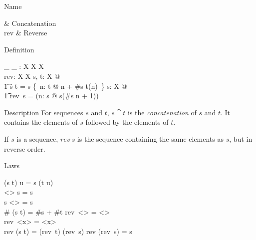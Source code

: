 \begin{manpage}\label{p:4020}
\item[Name]
\begin{name}
        \cat & Concatenation\symdex{$\cat$} \\
        rev & Reverse
\end{name}

\item[Definition]
\begin{gendef}[X]
        \_ \cat \_ :  \seq X \cross \seq X \fun \seq X \\
        rev: \seq X \fun \seq X
\where
        \forall s, t: \seq X @ \\
\t1	    s \cat t = s \cup \{~n: \dom t @ n + \#s \mapsto t(n)~\}
\also
        \forall s: \seq X @ \\
\t1         rev~s = (\lambda n: \dom s @ s(\#s \minus n + 1))
\end{gendef}

\item[Description]
For sequences $s$ and $t$, $s \cat t$ is the {\em concatenation\/}
of $s$ and $t$. It contains the elements of $s$ followed by the
elements of $t$.

If $s$ is a sequence, $rev~s$ is the sequence containing the same
elements as $s$, but in reverse order.

\item[Laws]
\begin{laws}
        (s \cat t) \cat u = s \cat (t \cat u) \\
        <> \cat s = s \\
        s \cat <> = s \\
        \# (s \cat t) = \#s + \#t
\also
        rev~<> = <> \\
        rev~<x> = <x> \\
        rev (s \cat t) = (rev~t) \cat (rev~s)
\also
        rev (rev~s) = s
\end{laws}
\end{manpage}
